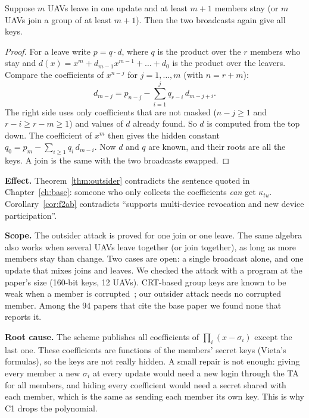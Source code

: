 \documentclass[11pt,openany]{report}
\begin{document}
\begin{proposition}\label{prop:batch}
Suppose $m$ UAVs leave in one update and at least $m+1$ members stay (or $m$ UAVs join a group of at least $m+1$). Then the two broadcasts again give
all keys.
\end{proposition}
\begin{proof}
For a leave write $p=q\cdot d$, where $q$ is the product over the $r$ members who stay and $d(x)=x^m+d_{m-1}x^{m-1}+\dots+d_0$ is the product over the
leavers. Compare the coefficients of $x^{n-j}$ for $j=1,\dots,m$ (with $n=r+m$):
\[ d_{m-j}=p_{n-j}-\sum_{i=1}^{j}q_{r-i}\,d_{m-j+i}. \]
The right side uses only coefficients that are not masked ($n-j\ge1$ and $r-i\ge r-m\ge1$) and values of $d$ already found. So $d$ is computed from the
top down. The coefficient of $x^m$ then gives the hidden constant $q_0=p_m-\sum_{i\ge1}q_i\,d_{m-i}$. Now $d$ and $q$ are known, and their roots are
all the keys. A join is the same with the two broadcasts swapped.
\end{proof}

\textbf{Effect.} Theorem~\ref{thm:outsider} contradicts the sentence quoted in Chapter~\ref{ch:base}: someone who only collects the coefficients \emph{can}
get $\kappa_{tu}$. Corollary~\ref{cor:f2ab} contradicts ``supports multi-device revocation and new device participation''.

\textbf{Scope.} The outsider attack is proved for one join or one leave. The same algebra also works when several UAVs leave together (or join
together), as long as more members stay than change. Two cases are open: a single broadcast alone, and one update that mixes joins and leaves. We
checked the attack with a program at the paper's size (160-bit keys, 12 UAVs). CRT-based group keys are known to be weak when a member is
corrupted~\cite{sp24}; our outsider attack needs no corrupted member. Among the 94 papers that cite the base paper we found none that reports it.

\textbf{Root cause.} The scheme publishes all coefficients of $\prod_i(x-\sigma_i)$ except the last one. These coefficients are functions of the
members' secret keys (Vieta's formulas), so the keys are not really hidden. A small repair is not enough: giving every member a new $\sigma_i$ at
every update would need a new login through the TA for all members, and hiding every coefficient would need a secret shared with each member, which
is the same as sending each member its own key. This is why C1 drops the polynomial.
\end{document}
